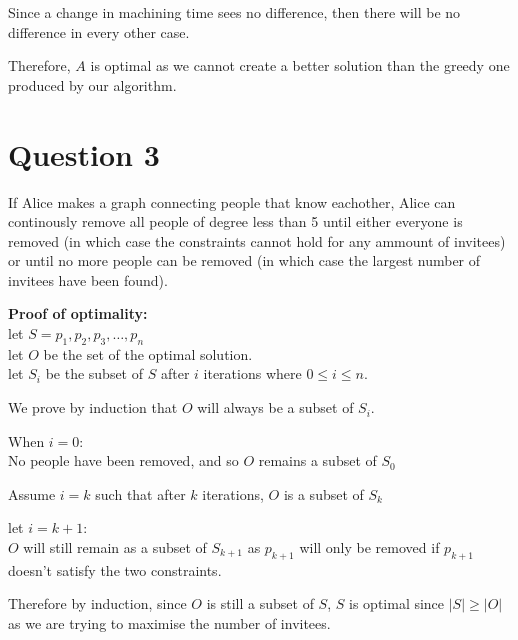 \documentclass{article}
\begin{document}
Since a change in machining time sees no difference, then there will be no difference in every other case.

Therefore, $A$ is optimal as we cannot create a better solution than the greedy one produced by our algorithm.





\section*{Question 3}
If Alice makes a graph connecting people that know eachother, Alice can continously remove all people of degree less than 5 until either everyone is removed (in which case the constraints cannot hold for any ammount of invitees) or until no more people can be removed (in which case the largest number of invitees have been found).

\textbf{Proof of optimality:}\\
let $S = {p_1, p_2, p_3, \ldots, p_n}$\\
let $O$ be the set of the optimal solution.\\
let $S_i$ be the subset of $S$ after $i$ iterations where $0 \leq i \leq n$.

We prove by induction that $O$ will always be a subset of $S_i$.

When $i = 0$:\\
No people have been removed, and so $O$ remains a subset of $S_0$

Assume $i = k$ such that after $k$ iterations, $O$ is a subset of $S_k$

let $i = k + 1$:\\
$O$ will still remain as a subset of $S_{k+1}$ as $p_{k+1}$ will only be removed if $p_{k+1}$ doesn't satisfy the two constraints.

Therefore by induction, since $O$ is still a subset of $S$, $S$ is optimal since $|S| \geq |O|$ as we are trying to maximise the number of invitees.
\end{document}
